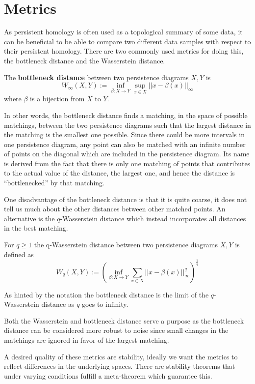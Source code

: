  \section{Metrics}
  As persistent homology is often used as a topological summary of some data, it can be beneficial to be able to compare two different data samples with respect to their persistent homology. There are two commonly used metrics for doing this, the bottleneck distance and the Wasserstein distance.
  \begin{definition}
    The \textbf{bottleneck distance} between two persistence diagrams $X,Y$ is
    \[W_{\infty}(X,Y) := \inf_{\beta: X \to Y} \sup_{x \in X} ||x-\beta(x)||_{\infty}\]
    where $\beta$ is a bijection from $X$ to $Y$.
  \end{definition}
In other words, the bottleneck distance finds a matching, in the space of possible matchings, between the two persistence diagrams such that the largest distance in the matching is the smallest one possible. Since there could be more intervals in one persistence diagram, any point can also be matched with an infinite number of points on the diagonal which are included in the persistence diagram. Its name is derived from the fact that there is only one matching of points that contributes to the actual value of the distance, the largest one, and hence the distance is ``bottlenecked'' by that matching.

One disadvantage of the bottleneck distance is that it is quite coarse, it does not tell us much about the other distances between other matched points. An alternative is the $q$-Wasserstein distance which instead incorporates all distances in the best matching.
  \begin{definition}
    For $q \geq 1$ the q-Wasserstein distance between two persistence diagrams $X,Y$ is defined as
    \[W_{q}(X,Y) := (\inf_{\beta: X \to Y} \sum_{x \in X}  ||x-\beta(x)||_{\infty}^{q})^{\frac{1}{q}}\]
  \end{definition}
  As hinted by the notation the bottleneck distance is the limit of the $q$-Wasserstein distance as $q$ goes to infinity.

  Both the Wasserstein and bottleneck distance serve a purpose as the bottleneck distance can be considered more robust to noise since small changes in the matchings are ignored in favor of the largest matching.

  A desired quality of these metrics are stability, ideally we want the metrics to reflect differences in the underlying spaces. There are stability theorems that under varying conditions fulfill a meta-theorem which guarantee this.

